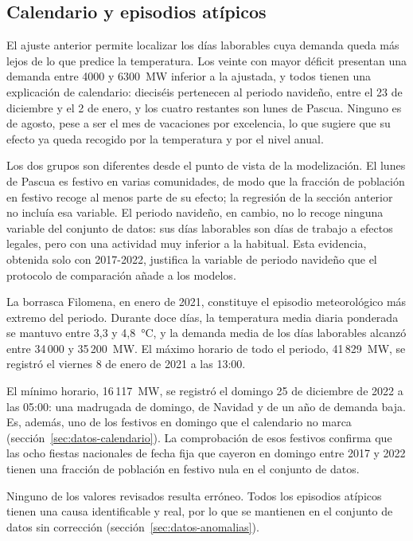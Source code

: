 \subsection{Calendario y episodios atípicos}\label{sec:explo-anomalias}

El ajuste anterior permite localizar los días laborables cuya demanda queda
más lejos de lo que predice la temperatura. Los veinte con mayor déficit
presentan una demanda entre 4000 y 6300~MW inferior a la ajustada, y todos
tienen una explicación de calendario: dieciséis pertenecen al periodo
navideño, entre el 23 de diciembre y el 2 de enero, y los cuatro restantes
son lunes de Pascua. Ninguno es de agosto, pese a ser el mes de vacaciones
por excelencia, lo que sugiere que su efecto ya queda recogido por la
temperatura y por el nivel anual.

Los dos grupos son diferentes desde el punto de vista de la modelización. El
lunes de Pascua es festivo en varias comunidades, de modo que la fracción de
población en festivo recoge al menos parte de su efecto; la regresión de la
sección anterior no incluía esa variable. El periodo navideño, en cambio, no
lo recoge ninguna variable del conjunto de datos: sus días laborables son
días de trabajo a efectos legales, pero con una actividad muy inferior a la
habitual. Esta evidencia, obtenida solo con 2017-2022, justifica la variable
de periodo navideño que el protocolo de comparación añade a los modelos.

La borrasca Filomena, en enero de 2021, constituye el episodio meteorológico
más extremo del periodo. Durante doce días, la temperatura media diaria
ponderada se mantuvo entre 3,3 y 4,8~°C, y la demanda media de los días
laborables alcanzó entre 34\,000 y 35\,200~MW. El máximo horario de todo el
periodo, 41\,829~MW, se registró el viernes 8 de enero de 2021 a las 13:00.

El mínimo horario, 16\,117~MW, se registró el domingo 25 de diciembre de 2022
a las 05:00: una madrugada de domingo, de Navidad y de un año de demanda
baja. Es, además, uno de los festivos en domingo que el calendario no marca
(sección~\ref{sec:datos-calendario}). La comprobación de esos festivos
confirma que las ocho fiestas nacionales de fecha fija que cayeron en
domingo entre 2017 y 2022 tienen una fracción de población en festivo nula
en el conjunto de datos.

Ninguno de los valores revisados resulta erróneo. Todos los episodios
atípicos tienen una causa identificable y real, por lo que se mantienen en el
conjunto de datos sin corrección (sección~\ref{sec:datos-anomalias}).

